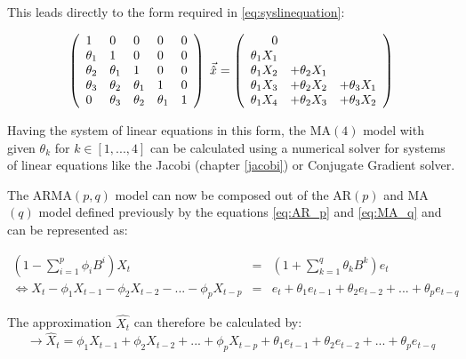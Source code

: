This leads directly to the form required in \eqref{eq:syslinequation}:

\begin{equation}\label{eq:example_MA_three_system_3}
\left(\begin{array}[c]{lllll}
1 & 0 & 0 & 0 & 0\\
\theta_1 & 1 & 0 & 0 & 0\\
\theta_2 & \theta_1& 1 & 0 & 0\\
\theta_3 & \theta_2 & \theta_1& 1 & 0\\
0 & \theta_3 & \theta_2 & \theta_1& 1
\end{array}\right) \;\vec{\hat{x}} =
\left(\begin{array}[c]{rrr}
0 &&\\ 
\theta_1 X_{1} &&\\
\theta_1 X_{2} &+ \theta_2 X_{1} &\\
\theta_1 X_{3} &+ \theta_2 X_{2} &+ \theta_3 X_{1} \\
\theta_1 X_{4} &+ \theta_2 X_{3} &+ \theta_3 X_{2} 
\end{array}\right)
\end{equation}

Having the system of linear equations in this form, the \acs{MA}$(4)$ model with given $\theta_k$ for $k \in [1,...,4]$ can be calculated using a numerical solver for systems of linear equations like the Jacobi (chapter \ref{jacobi}) or Conjugate Gradient solver.

The \acs{ARMA}$(p,q)$ model can now be composed out of the \acl{AR}$(p)$ and \acl{MA}$(q)$ model defined previously by the equations \eqref{eq:AR_p} and \eqref{eq:MA_q} and can be represented as:

\begin{equation}\label{eq:ARMA_1}
\begin{array}{ccc}
(1-\displaystyle\sum_{i=1}^{p} \phi_i B^i) X_t & = & (1+\displaystyle\sum_{k=1}^{q} \theta_k B^k)e_t\\
\Leftrightarrow X_t - \phi_1 X_{t-1} - \phi_2 X_{t-2} - ... - \phi_p X_{t-p} & = & e_t + \theta_1 e_{t-1}+ \theta_2 e_{t-2}+ ... + \theta_p e_{t-q}
\end{array}
\end{equation}

The approximation $\hat{X_t}$ can therefore be calculated by:
\begin{equation}\label{eq:ARMA_2}
\rightarrow  \hat{X}_t = \phi_1 X_{t-1} + \phi_2 X_{t-2} + ... + \phi_p X_{t-p} + \theta_1 e_{t-1}+ \theta_2 e_{t-2}+ ... + \theta_p e_{t-q}
\end{equation}

